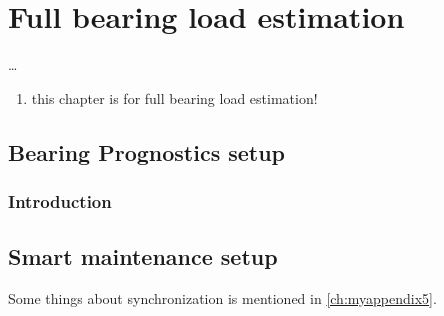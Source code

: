 \chapter{Full bearing load estimation}                                 \label{ch:full_bearing_load_estimation}

\ldots

\begin{enumerate}
    \item this chapter is for full bearing load estimation!
\end{enumerate}

\section{Bearing Prognostics setup}

\subsection{Introduction}





\section{Smart maintenance setup}

Some things about synchronization is mentioned in \cref{ch:myappendix5}.



\cleardoublepage

